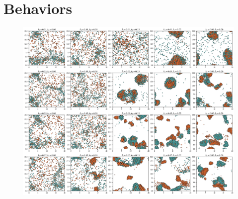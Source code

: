 \documentclass{article}
\begin{document}
\section{Behaviors}
\begin{figure}[H]
    \centering
    \includegraphics[width=\textwidth]{figs/bigGraphParticle_k23_0.5.png}
\end{figure}

% 
\end{document}
